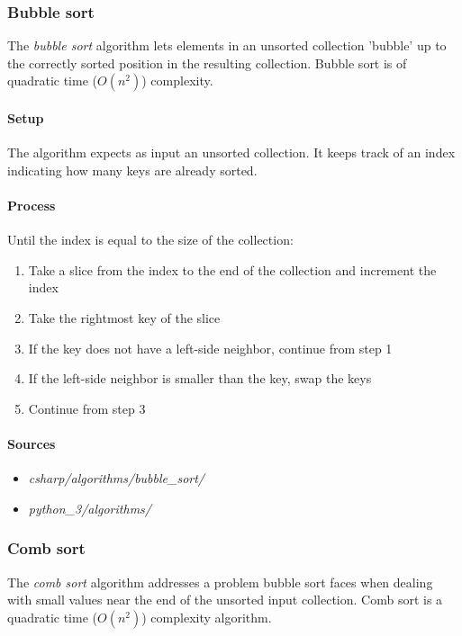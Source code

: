 \documentclass{article}
\begin{document}
\subsubsection{Bubble sort}
The {\em bubble sort} algorithm lets elements in an unsorted collection 'bubble' up to the correctly sorted position
in the resulting collection. Bubble sort is of quadratic time (\(O(n^2)\)) complexity.

\paragraph{Setup}
The algorithm expects as input an unsorted collection. It keeps track of an index indicating how many keys are
already sorted.

\paragraph{Process}
Until the index is equal to the size of the collection:
\begin{enumerate}
\item{Take a slice from the index to the end of the collection and increment the index}
\item{Take the rightmost key of the slice}
\item{If the key does not have a left-side neighbor, continue from step 1}
\item{If the left-side neighbor is smaller than the key, swap the keys}
\item{Continue from step 3}
\end{enumerate}

\paragraph{Sources}
\begin{itemize}
\item{{\em csharp/algorithms/bubble\_sort/}}
\item{{\em python\_3/algorithms/}}
\end{itemize}


\subsubsection{Comb sort}
The {\em comb sort} algorithm addresses a problem bubble sort faces when dealing with small values near the end of
the unsorted input collection. Comb sort is a quadratic time (\(O(n^2)\)) complexity algorithm.
\end{document}
